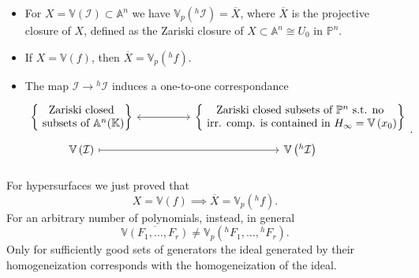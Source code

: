 \begin{lem}\leavevmode\vspace{-.2\baselineskip}
	\begin{itemize}
		\item For $X = \mathbb{V}\left( \mathcal{I} \right) \subset \mathbb{A}^{n}$ we have
			$\mathbb{V}_p\left( {}^h \mathcal{I} \right) = \overline{X}$, where
			$\overline{X}$ is the projective closure of $X$, defined as the Zariski closure of
			$X \subset \mathbb{A}^{n} \cong U_0$ in $\mathbb{P}^{n}$.
		\item If $X = \mathbb{V}\left( f \right)$, then $\overline{X} = \mathbb{V}_p\left( {}^h f \right)$.
		\item The map $\mathcal{I} \to {}^h \mathcal{I}$ induces a one-to-one correspondance
	\begin{equation}
	\begin{tikzcd}[row sep=tiny]
			\left\{\begin{matrix}
				\text{ Zariski closed }\\
				\text{ subsets of } \mathbb{A}^{n}(\K)
			\end{matrix}\right\} \arrow[rr, "", leftrightarrow] & &
			\left\{  \begin{matrix}
				\text{ Zariski closed subsets of } \mathbb{P}^{n} \text{ s.t. no }\\
				\text{ irr. comp. is contained in } H_\infty = \mathbb{V}\left( x_0 \right)\\
			\end{matrix}\right\} \\
			\mathbb{V}\left( \mathcal{I} \right) \arrow[rr, "", leftrightarrow, maps to] & & \mathbb{V}\left( {}^h \mathcal{I} \right)\\
	\end{tikzcd}
	.\end{equation} 
	\end{itemize}
\end{lem}

\begin{rem}
	For hypersurfaces we just proved that
	\begin{equation}
		X = \mathbb{V}\left( f \right) \implies \overline{X} = \mathbb{V}_p\left( {}^h f \right)
	.\end{equation} 
	For an arbitrary number of polynomials, instead, in general
	\begin{equation}
		\overline{\mathbb{V}\left( F_1, \ldots, F_r \right)} \neq \mathbb{V}_p\left( {}^h F_1, \ldots, {}^h F_r \right)
	.\end{equation} 
	Only for sufficiently good sets of generators the ideal generated by their homogeneization corresponds with the homogeneization of the ideal.
\end{rem}

